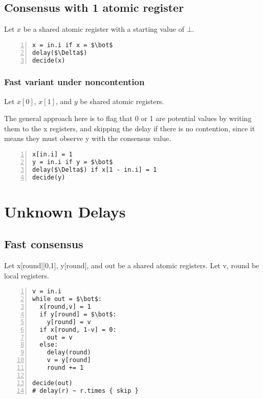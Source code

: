\documentclass{idc_msc}
\begin{document}
\subsection{Consensus with 1 atomic register}

Let $x$ be a shared atomic register with a starting value of $\bot$.

\begin{lstlisting}[frame=L,mathescape=true,numbers=left,title={For process i in 1...n}]
x = in.i if x = $\bot$
delay($\Delta$)
decide(x)
\end{lstlisting}

\subsubsection{Fast variant under noncontention}

Let $x[0]$, $x[1]$, and $y$ be shared atomic registers.

The general approach here is to flag that 0 or 1 are potential values by writing them to the x registers,
and skipping the delay if there is no contention, since it means they must observe y with the consensus value.

\begin{lstlisting}[frame=L,mathescape=true,numbers=left,title={For process i in 1...n}]
x[in.i] = 1
y = in.i if y = $\bot$
delay($\Delta$) if x[1 - in.i] = 1
decide(y)
\end{lstlisting}


\clearpage
\section{Unknown Delays}

\subsection{Fast consensus}

Let x[round][0,1], y[round], and out be a shared atomic registers.
Let v, round be local registers.

\begin{lstlisting}[frame=L,mathescape=true,numbers=left,title={For process i in 1...n}]
v = in.i
while out = $\bot$:
  x[round,v] = 1
  if y[round] = $\bot$:
    y[round] = v
  if x[round, 1-v] = 0:
    out = v
  else:
    delay(round)
    v = y[round]
    round += 1

decide(out)
# delay(r) ~ r.times { skip }
\end{lstlisting}
\end{document}
